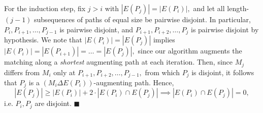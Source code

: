\documentclass{article}
\begin{document}

  For the induction step, fix $j>i$ with $|E(P_j)|=|E(P_i)|,$ and let all length-$(j-1)$ subsequences of paths of equal size be pairwise disjoint. In particular, $P_i,P_{i+1},\dots,P_{j-1}$ is pairwise disjoint, and $P_{i+1},P_{i+2},\dots,P_j$ is pairwise disjoint by hypothesis. We note that $|E(P_i)|=|E(P_j)|$ implies $|E(P_i)|=|E(P_{i+1})|=\dots=|E(P_j)|,$ since our algorithm augments the matching along a \textit{shortest} augmenting path at each iteration. Then, since $M_{j}$ differs from $M_i$ only at $P_{i+1},P_{i+2},\dots, P_{j-1},$ from which $P_j$ is disjoint, it follows that $P_{j}$ is a $(M_i\Delta E(P_i))$-augmenting path. Hence,
  $$|E(P_{j})|\geq |E(P_i)|+2\cdot |E(P_i)\cap E(P_{j})|\implies |E(P_i)\cap E(P_j)|=0,$$i.e. $P_i, P_{j}$ are disjoint. $\blacksquare$












\end{document}
